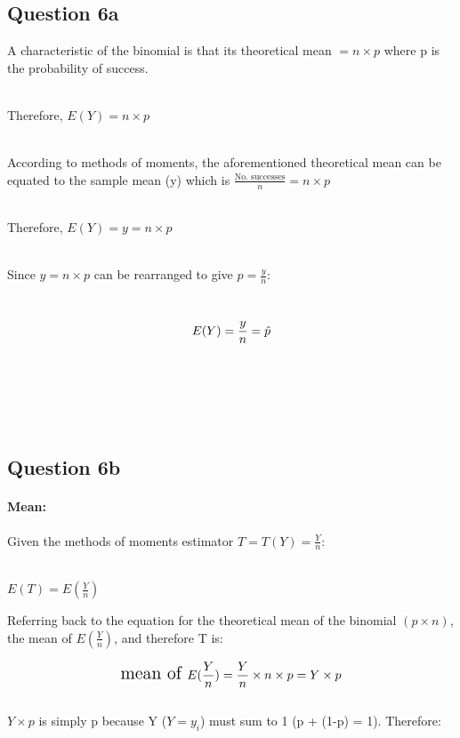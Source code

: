 \documentclass[
]{article}
\begin{document}
\subsection{Question 6a}\label{question-6a}

\hfill\break
A characteristic of the binomial is that its theoretical mean
\(= n \times p\) where p is the probability of success.\\
\strut \\
Therefore, \(E(Y) = n\times p\)\\
\strut \\
According to methods of moments, the aforementioned theoretical mean can
be equated to the sample mean (y) which is
\(\frac{\text{No. successes}}{n} = n \times p\)\\
\strut \\
Therefore, \(E(Y) = y = n \times p\)\\
\strut \\

Since \(y = n\times p\) can be rearranged to give \(p = \frac{y}{n}\):\\
\strut \\

\[
\Large
E(Y) = \frac{y}{n} = \hat{p}
\]\\
\strut \\
\strut \\

\subsection{Question 6b}\label{question-6b}

\paragraph{Mean:}\label{mean}

\hfill\break

Given the methods of moments estimator \(T = T(Y) = \frac{Y}{n}\):\\
\strut \\
\(E(T) = E(\frac{Y}{n})\)

Referring back to the equation for the theoretical mean of the binomial
\((p \times n)\), the mean of \(E(\frac{Y}{n})\), and therefore T is:

\[
\Large
\text{mean of } E(\frac{Y}{n}) = \frac{Y}{n} \times n \times p =  Y\times p
\]\\

\(Y \times p\) is simply p because Y (\(Y = y_i\)) must sum to 1 (p +
(1-p) = 1). Therefore:
\end{document}

